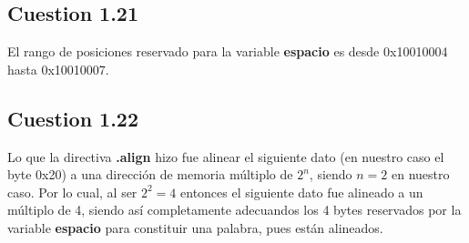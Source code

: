 \documentclass[11pt]{article}
\begin{document}
\begin{large}
\begin{flushleft}
\subsection*{Cuestion 1.21}
El rango de posiciones reservado para la variable \textbf{espacio} es desde 0x10010004 hasta 0x10010007.

\subsection*{Cuestion 1.22}
Lo que la directiva \textbf{.align} hizo fue alinear el siguiente dato (en nuestro caso el byte 0x20) a una dirección de memoria múltiplo de $2^n$, siendo $n=2$ en nuestro caso. Por lo cual, al ser $2^2=4$ entonces el siguiente dato fue alineado a un múltiplo de 4, siendo así completamente adecuandos los 4 bytes reservados por la variable \textbf{espacio} para constituir una palabra, pues están alineados.





\end{flushleft}
\end{large}
\end{document}
